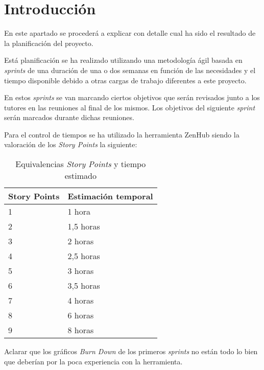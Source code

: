
\section{Introducción}

En este apartado se procederá a explicar con detalle cual ha sido el resultado de la planificación del proyecto.

Está planificación se ha realizado utilizando  una metodología ágil basada en \emph{sprints} de una duración de una o dos semanas en función de las necesidades y el tiempo disponible debido a otras cargas de trabajo diferentes a este proyecto.

En estos \emph{sprints} se van marcando ciertos objetivos que serán revisados junto a los tutores en las reuniones al final de los mismos. Los objetivos del siguiente \emph{sprint} serán marcados durante dichas reuniones.
 
Para el control de tiempos se ha utilizado la herramienta ZenHub siendo la valoración de los \emph{Story Points} la siguiente:


\begin{table}[htp]
\begin{center}
\begin{tabular}{ll}
\toprule
Story Points & Estimación temporal \\ \midrule
1            & 1 hora              \\ \hline
2            & 1,5 horas           \\ \hline
3            & 2 horas             \\ \hline
4            & 2,5 horas           \\ \hline
5            & 3 horas             \\ \hline
6            & 3,5 horas           \\ \hline
7            & 4 horas             \\ \hline
8            & 6 horas             \\ \hline
9            & 8 horas             \\ \bottomrule
\end{tabular}
\caption{Equivalencias \emph{Story Points} y tiempo estimado}
\label{tabla:StoryPoints/tiempo}
\end{center}
\end{table}

Aclarar que los gráficos \emph{Burn Down} de los primeros \emph{sprints} no están todo lo bien que deberían por la poca experiencia con la herramienta.

